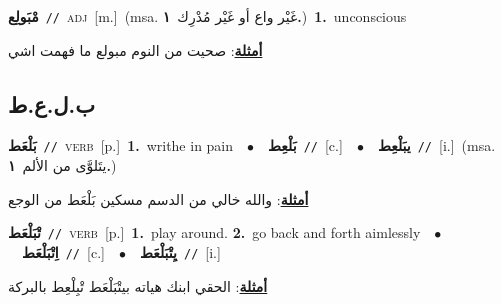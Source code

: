 \documentclass[10pt,a4paper,twoside]{article} %
\begin{document}
\begin{multicols}{2}
{\setlength\topsep{0pt}\textbf{\foreignlanguage{arabic}{مْبَولِع}}\ {\color{gray}\texttt{//}\color{black}}\ \textsc{adj}\ [m.]\ \color{gray}(msa. \foreignlanguage{arabic}{غَيْر واع أو غَيْر مُدْرِك}~\foreignlanguage{arabic}{\textbf{١.}})\color{black}\ \textbf{1.}~unconscious\  \begin{flushright}\color{gray}\foreignlanguage{arabic}{\textbf{\underline{\foreignlanguage{arabic}{أمثلة}}}: صحيت من النوم مبولع ما فهمت اشي}\end{flushright}\color{black}} \vspace{2mm}

\vspace{-3mm}
\subsection*{\color{blue}\foreignlanguage{arabic}{ب.ل.ع.ط}\color{blue}{}} 

{\setlength\topsep{0pt}\textbf{\foreignlanguage{arabic}{بَلْعَط}}\ {\color{gray}\texttt{//}\color{black}}\ \textsc{verb}\ [p.]\ \textbf{1.}~writhe in pain\ \ $\bullet$\ \ \setlength\topsep{0pt}\textbf{\foreignlanguage{arabic}{بَلْعِط}}\ {\color{gray}\texttt{//}\color{black}}\ [c.]\ \ $\bullet$\ \ \setlength\topsep{0pt}\textbf{\foreignlanguage{arabic}{يبَلْعِط}}\ {\color{gray}\texttt{//}\color{black}}\ [i.]\ \color{gray}(msa. \foreignlanguage{arabic}{يتَلوَّى من الألم}~\foreignlanguage{arabic}{\textbf{١.}})\color{black}\  \begin{flushright}\color{gray}\foreignlanguage{arabic}{\textbf{\underline{\foreignlanguage{arabic}{أمثلة}}}: والله خالي من الدسم مسكين بَلْعَط من الوجع}\end{flushright}\color{black}} \vspace{2mm}

{\setlength\topsep{0pt}\textbf{\foreignlanguage{arabic}{تْبَلْعَط}}\ {\color{gray}\texttt{//}\color{black}}\ \textsc{verb}\ [p.]\ \textbf{1.}~play around.  \textbf{2.}~go back and forth aimlessly\ \ $\bullet$\ \ \setlength\topsep{0pt}\textbf{\foreignlanguage{arabic}{اِتْبَلْعَط}}\ {\color{gray}\texttt{//}\color{black}}\ [c.]\ \ $\bullet$\ \ \setlength\topsep{0pt}\textbf{\foreignlanguage{arabic}{يِتْبَلْعَط}}\ {\color{gray}\texttt{//}\color{black}}\ [i.]\  \begin{flushright}\color{gray}\foreignlanguage{arabic}{\textbf{\underline{\foreignlanguage{arabic}{أمثلة}}}: الحقي ابنك هياته بيتْبَلْعَط تْبِلْعِط بالبركة}\end{flushright}\color{black}} \vspace{2mm}


\end{multicols}
\end{document}
